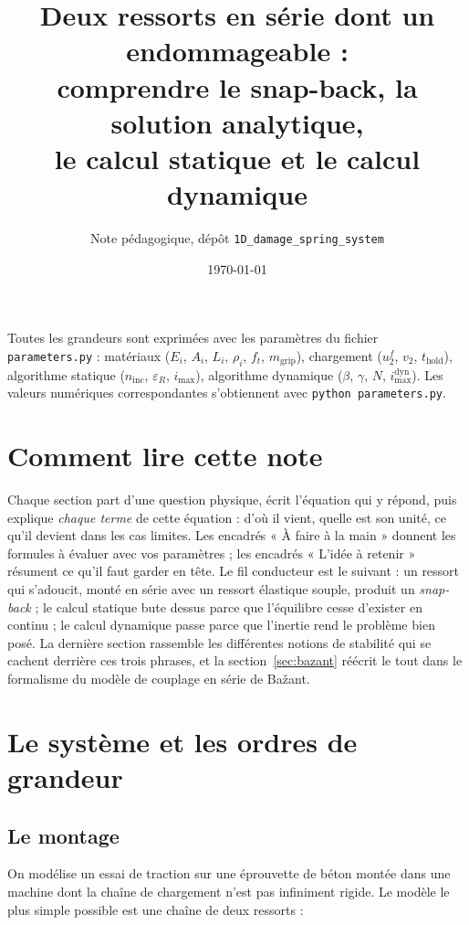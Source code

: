 \documentclass[11pt,a4paper]{article}
\title{Deux ressorts en série dont un endommageable :\\
comprendre le snap-back, la solution analytique,\\
le calcul statique et le calcul dynamique}
\author{Note pédagogique, dépôt \texttt{1D\_damage\_spring\_system}}
\date{\today}
\newcommand{\imax}{i_{\max}}
\newcommand{\ninc}{n_{\text{inc}}}
\begin{document}
\maketitle

\begin{center}
\small Toutes les grandeurs sont exprimées avec les paramètres du fichier \texttt{parameters.py} :
matériaux ($E_i$, $A_i$, $L_i$, $\rho_i$, $f_t$, $m_{\text{grip}}$), chargement ($u_2^f$, $v_2$, $t_{\text{hold}}$),
algorithme statique ($\ninc$, $\varepsilon_R$, $\imax$), algorithme dynamique ($\beta$, $\gamma$, $N$, $i_{\max}^{\text{dyn}}$).
Les valeurs numériques correspondantes s'obtiennent avec \texttt{python parameters.py}.
\end{center}

\tableofcontents
\clearpage

\section*{Comment lire cette note}
Chaque section part d'une question physique, écrit l'équation qui y répond, puis explique
\emph{chaque terme} de cette équation : d'où il vient, quelle est son unité, ce qu'il devient
dans les cas limites. Les encadrés « À faire à la main » donnent les formules à évaluer avec
vos paramètres ; les encadrés « L'idée à retenir » résument ce qu'il faut garder en tête.
Le fil conducteur est le suivant : un ressort qui s'adoucit, monté en série avec un ressort
élastique souple, produit un \emph{snap-back} ; le calcul statique bute dessus parce que
l'équilibre cesse d'exister en continu ; le calcul dynamique passe parce que l'inertie
rend le problème bien posé. La dernière section rassemble les différentes notions de
stabilité qui se cachent derrière ces trois phrases, et la section~\ref{sec:bazant} réécrit le
tout dans le formalisme du modèle de couplage en série de Bažant.

\section{Le système et les ordres de grandeur}

\subsection{Le montage}
On modélise un essai de traction sur une éprouvette de béton montée dans une machine dont la
chaîne de chargement n'est pas infiniment rigide. Le modèle le plus simple possible est une
chaîne de deux ressorts :
\end{document}
